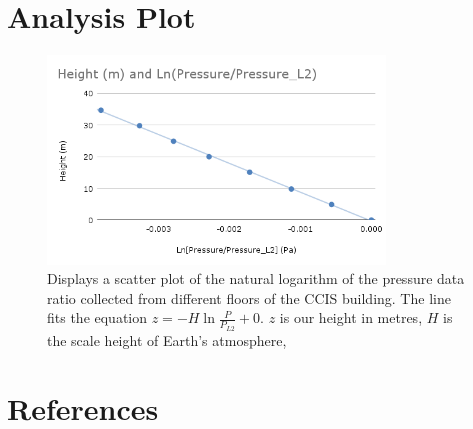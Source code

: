 \documentclass{article}
\begin{document}
\section{Analysis Plot}
\begin{figure}[h]
    \centering
    \includegraphics[width=0.8\textwidth]{Height-LogData.png}
    \caption{Displays a scatter plot of the natural logarithm of the pressure data ratio collected from different floors of the CCIS building.
    The line fits the equation $z = -H\ln\frac{P}{P_{L2}} + 0$.
    $z$ is our height in metres, $H$ is the scale height of Earth's atmosphere,}
\end{figure}

\section{References}
\end{document}
